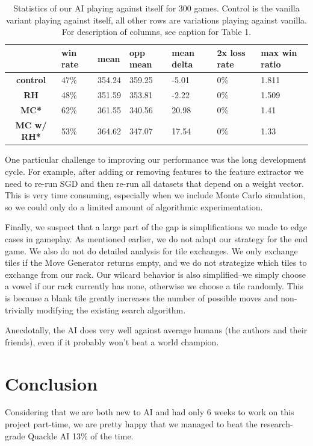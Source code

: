\documentclass[12pt]{article}
\begin{document}
\begin{table}[h!]
  \centering
  \begin{tabular}{c|l|l|l|l|l|l}
    \textbf{} & \textbf{win rate} & \textbf{mean} & \textbf{opp mean} & \textbf{mean delta} &  \textbf{2x loss rate} & \textbf{max win ratio} \\\hline
  \textbf{control}   & 47\% & 354.24 & 359.25 & -5.01  & 0\%  & 1.811\\
  \textbf{RH}        & 48\% & 351.59 & 353.81 & -2.22  & 0\%  & 1.509\\
  \textbf{MC*}       & 62\% & 361.55 & 340.56 & 20.98  & 0\%  & 1.41 \\
  \textbf{MC w/ RH*} & 53\% & 364.62 & 347.07 & 17.54  & 0\%  & 1.33 \\
\end{tabular}
  \caption{Statistics of our AI playing against itself for 300
    games. Control is the vanilla variant playing against itself, all
    other rows are variations playing against vanilla. For description
    of columns, see caption for Table 1.}
\end{table}

One particular challenge to improving our performance was the long
development cycle. For example, after adding or removing features to
the feature extractor we need to re-run SGD and then re-run all
datasets that depend on a weight vector. This is very time consuming,
especially when we include Monte Carlo simulation, so we could only do
a limited amount of algorithmic experimentation.

Finally, we suspect that a large part of the gap is simplifications we
made to edge cases in gameplay. As mentioned earlier, we do not adapt
our strategy for the end game. We also do not do detailed analysis for
tile exchanges. We only exchange tiles if the Move Generator returns
empty, and we do not strategize which tiles to exchange from our
rack. Our wilcard behavior is also simplified--we simply choose a
vowel if our rack currently has none, otherwise we choose a tile
randomly. This is because a blank tile greatly increases the number of
possible moves and non-trivially modifying the existing search
algorithm.

Anecdotally, the AI does very well against average humans (the authors
and their friends), even if it probably won't beat a world champion.

\section*{Conclusion}
Considering that we are both new to AI and had only 6 weeks to work on
this project part-time, we are pretty happy that we managed to beat
the research-grade Quackle AI 13\% of the time.
\end{document}
